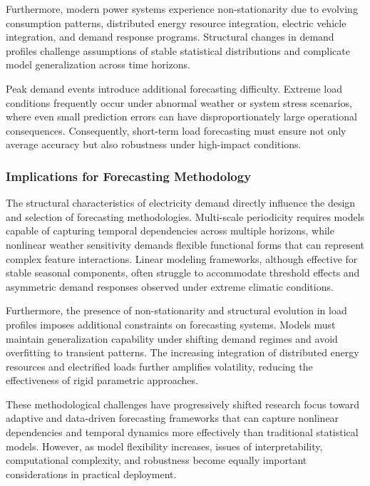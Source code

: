\documentclass[conference]{IEEEtran}
\begin{document}
Furthermore, modern power systems experience non-stationarity due to evolving consumption patterns, distributed energy resource integration, electric vehicle integration, and demand response programs. Structural changes in demand profiles challenge assumptions of stable statistical distributions and complicate model generalization across time horizons\cite{10320357}.

Peak demand events introduce additional forecasting difficulty. Extreme load conditions frequently occur under abnormal weather or system stress scenarios, where even small prediction errors can have disproportionately large operational consequences. Consequently, short-term load forecasting must ensure not only average accuracy but also robustness under high-impact conditions.

\subsubsection{Implications for Forecasting Methodology}

The structural characteristics of electricity demand directly influence the design and selection of forecasting methodologies. Multi-scale periodicity requires models capable of capturing temporal dependencies across multiple horizons, while nonlinear weather sensitivity demands flexible functional forms that can represent complex feature interactions. Linear modeling frameworks, although effective for stable seasonal components, often struggle to accommodate threshold effects and asymmetric demand responses observed under extreme climatic conditions.

Furthermore, the presence of non-stationarity and structural evolution in load profiles imposes additional constraints on forecasting systems. Models must maintain generalization capability under shifting demand regimes and avoid overfitting to transient patterns. The increasing integration of distributed energy resources and electrified loads further amplifies volatility, reducing the effectiveness of rigid parametric approaches.

These methodological challenges have progressively shifted research focus toward adaptive and data-driven forecasting frameworks that can capture nonlinear dependencies and temporal dynamics more effectively than traditional statistical models. However, as model flexibility increases, issues of interpretability, computational complexity, and robustness become equally important considerations in practical deployment.
\end{document}
